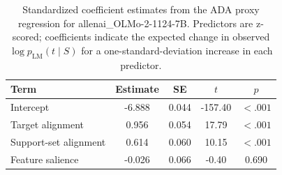 \begin{table}

\caption{\label{tab:ada-coefficients-allenai-olmo-2-1124-7b}Standardized coefficient estimates from the ADA proxy regression for allenai_OLMo-2-1124-7B. Predictors are z-scored; coefficients indicate the expected change in observed $\log p_{\mathrm{LM}}(t \mid S)$ for a one-standard-deviation increase in each predictor.}
\centering
\begin{tabular}[t]{lcccc}
\toprule
Term & Estimate & SE & $t$ & $p$\\
\midrule
Intercept & -6.888 & 0.044 & -157.40 & $< .001$\\
Target alignment & 0.956 & 0.054 & 17.79 & $< .001$\\
Support-set alignment & 0.614 & 0.060 & 10.15 & $< .001$\\
Feature salience & -0.026 & 0.066 & -0.40 & 0.690\\
\bottomrule
\end{tabular}
\end{table}
